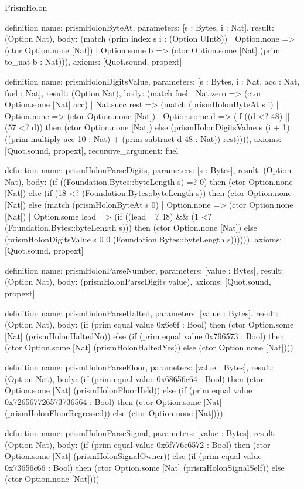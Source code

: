 \begin{lexlean}{PrismHolon}
\begin{semanticmodule}
definition{
  name: prismHolonByteAt,
  parameters: [s : Bytes, i : Nat],
  result: (Option Nat),
  body: (match (prim index s i : (Option UInt8))
    | Option.none => (ctor Option.none [Nat])
    | Option.some b => (ctor Option.some [Nat] (prim to_nat b : Nat))),
  axioms: [Quot.sound, propext]
}

definition{
  name: prismHolonDigitsValue,
  parameters: [s : Bytes, i : Nat, acc : Nat, fuel : Nat],
  result: (Option Nat),
  body: (match fuel
    | Nat.zero => (ctor Option.some [Nat] acc)
    | Nat.succ rest => (match (prismHolonByteAt s i)
      | Option.none => (ctor Option.none [Nat])
      | Option.some d => (if ((d <? 48) || (57 <? d)) then (ctor Option.none [Nat]) else (prismHolonDigitsValue s (i + 1) ((prim multiply acc 10 : Nat) + (prim subtract d 48 : Nat)) rest)))),
  axioms: [Quot.sound, propext],
  recursive_argument: fuel
}

definition{
  name: prismHolonParseDigits,
  parameters: [s : Bytes],
  result: (Option Nat),
  body: (if ((Foundation.Bytes::byteLength s) =? 0) then (ctor Option.none [Nat]) else (if (18 <? (Foundation.Bytes::byteLength s)) then (ctor Option.none [Nat]) else (match (prismHolonByteAt s 0)
    | Option.none => (ctor Option.none [Nat])
    | Option.some lead => (if ((lead =? 48) && (1 <? (Foundation.Bytes::byteLength s))) then (ctor Option.none [Nat]) else (prismHolonDigitsValue s 0 0 (Foundation.Bytes::byteLength s)))))),
  axioms: [Quot.sound, propext]
}

definition{
  name: prismHolonParseNumber,
  parameters: [value : Bytes],
  result: (Option Nat),
  body: (prismHolonParseDigits value),
  axioms: [Quot.sound, propext]
}

definition{
  name: prismHolonParseHalted,
  parameters: [value : Bytes],
  result: (Option Nat),
  body: (if (prim equal value 0x6e6f : Bool) then (ctor Option.some [Nat] (prismHolonHaltedNo)) else (if (prim equal value 0x796573 : Bool) then (ctor Option.some [Nat] (prismHolonHaltedYes)) else (ctor Option.none [Nat])))
}

definition{
  name: prismHolonParseFloor,
  parameters: [value : Bytes],
  result: (Option Nat),
  body: (if (prim equal value 0x68656c64 : Bool) then (ctor Option.some [Nat] (prismHolonFloorHeld)) else (if (prim equal value 0x726567726573736564 : Bool) then (ctor Option.some [Nat] (prismHolonFloorRegressed)) else (ctor Option.none [Nat])))
}

definition{
  name: prismHolonParseSignal,
  parameters: [value : Bytes],
  result: (Option Nat),
  body: (if (prim equal value 0x6f776e6572 : Bool) then (ctor Option.some [Nat] (prismHolonSignalOwner)) else (if (prim equal value 0x73656c66 : Bool) then (ctor Option.some [Nat] (prismHolonSignalSelf)) else (ctor Option.none [Nat])))
}


\end{semanticmodule}
\end{lexlean}
